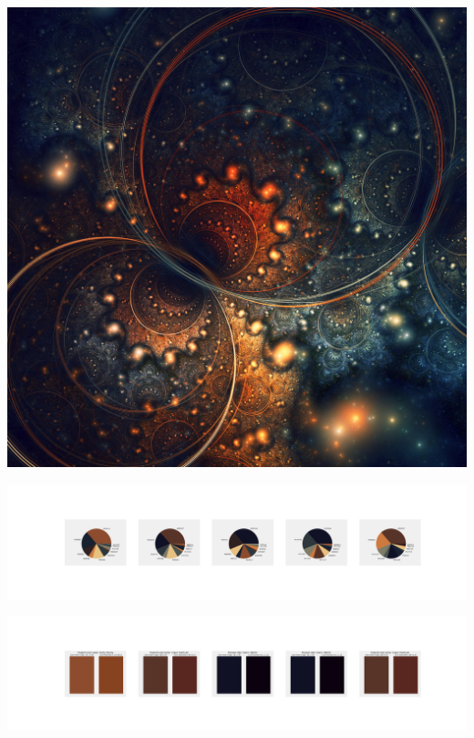 \documentclass[11pt]{article}
\begin{document}
\begin{landscape}
    \begin{center}
    \includegraphics[width=\textwidth]{./nbimg/file (169).jpg}
    \end{center}

    \begin{center}
    \includegraphics[width=250mm]{./nbimg/pie-77.jpg}
    \end{center}

    \begin{center}
    \includegraphics[width=250mm]{./nbimg/peak-77.jpg}
    \end{center}
    


\end{landscape}
\end{document}
